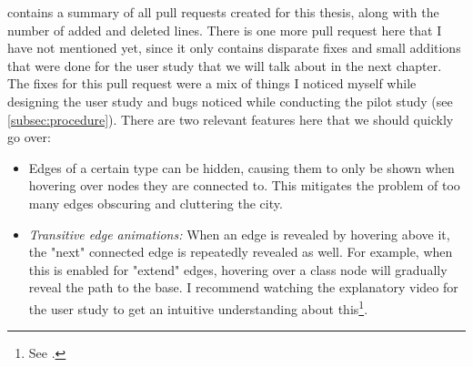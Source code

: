 \documentclass[../thesis]{subfiles}
\begin{document}
 contains a summary of all pull requests created for this thesis, along with the number of added and deleted lines.
There is one more pull request here that I have not mentioned yet, since it only contains disparate fixes and small additions that were done for the user study that we will talk about in the next chapter.
The fixes for this pull request were a mix of things I noticed myself while designing the user study and bugs noticed while conducting the pilot study (see \cref{subsec:procedure}).
There are two relevant features here that we should quickly go over:
\begin{itemize}
	\item Edges of a certain type can be hidden, causing them to only be shown when hovering over nodes they are connected to.
	      This mitigates the problem of too many edges obscuring and cluttering the \gls{city}.
	\item \emph{Transitive edge animations:}
	      When an edge is revealed by hovering above it, the "next" connected edge is repeatedly revealed as well.
	      For example, when this is enabled for "extend" edges, hovering over a class node will gradually reveal the path to the \gls{base}.
	      I recommend watching the explanatory video for the user study to get an intuitive understanding about this\footnote{
		      See .
	      }.
\end{itemize}
\end{document}
